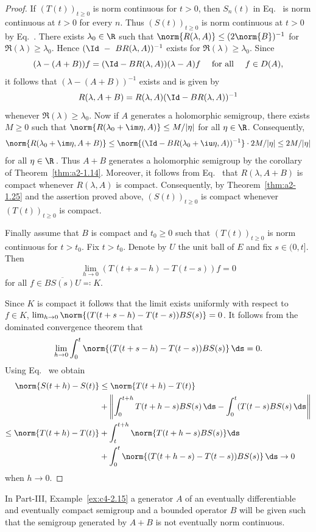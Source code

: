 \begin{proof}
If\/ $(T(t))_{t \geq 0}$ is norm continuous for $t > 0$, then $S_{n}(t)$ in Eq.~ is norm continuous at $t > 0$ for every $n$.
Thus $(S(t))_{t \geq 0}$ is norm continuous at $t > 0$ by Eq.~.
There exists $\lambda_{0} \in \R$ such that 
$\norm{R(\lambda,A)} \leq (2\norm{B})^{-1}$ for $\Re(\lambda) \geq \lambda_{0}$.
Hence $(\Id~-~BR(\lambda,A))^{-1}$ exists for $\Re(\lambda) \geq \lambda_{0}$.
Since 
\[
(\lambda -(A+B))f = (\Id - BR(\lambda,A))(\lambda - A)f  \quad \text{ for all } \quad f \in D(A),
\]
it follows that $(\lambda-(A+B))^{-1}$ exists and is given by
\begin{equation}\label{eq:a2-1.12}
    R(\lambda,A+B) = R(\lambda,A)(\Id-BR(\lambda,A))^{-1}
\end{equation}
whenever $\Re(\lambda) \geq \lambda_{0}$.
Now if\/ $A$ generates a holomorphic semigroup, there exists $M \geq 0$ such that $\norm{R(\lambda_{0}+\im\eta,A)} \leq M/|\eta|$ for all $\eta \in \R$.
Consequently, 
\[
\norm{R(\lambda_{0}+\im\eta,A+B)} \leq \norm{(\Id-BR(\lambda_{0} + \iu \eta,A))^{-1}} \cdot 2M/|\eta| \leq 2M/|\eta|
\]
for all $\eta \in \R$\,.
Thus $A + B$ generates a holomorphic semigroup by the corollary of Theorem~\ref{thm:a2-1.14}.
Moreover, it follows from Eq.~  that $R(\lambda,A+B)$ is compact whenever $R(\lambda,A)$  is compact.
Consequently, by Theorem~\ref{thm:a2-1.25} and the  assertion proved above, $(S(t))_{t \geq 0}$ is compact whenever $(T(t))_{t \geq 0}$ is compact.

Finally assume that $B$ is compact and $t_{0} \geq 0$ such that $(T(t))_{t \geq 0}$ 
is norm continuous for $t > t_{0}$.
Fix $t > t_{0}$.
Denote by $U$ the unit ball of\/ $E$ and fix $s \in (0,t]$.
Then
\[
    \lim_{h \to 0} (T(t+s-h) - T(t-s))f = 0
\]
for all $f \in \overline{BS(s)U} \eqqcolon K$.

Since $K$ is compact it follows that the limit exists uniformly with respect to $f \in K$, \ie  
$\lim_{h \to 0} \norm{(T(t+s-h) - T(t-s))BS(s)} = 0$.
It follows from the dominated convergence theorem that
\begin{equation}\label{eq:a2-1.13}
    \lim_{h \to 0} \int_{0}^{t} \norm{(T(t+s-h) - T(t-s))BS(s)}\, \ds = 0.
\end{equation}
Using  Eq.~  we obtain 
\begin{align*}
	\norm{S(t+h) - S(t)} &\leq \norm{T(t+h) - T(t)}   \\
	&+  \left\| \int_{0}^{t+h} T(t+h-s)BS(s)\, \ds 
	-  \int_{0}^{t} (T(t-s)BS(s)\, \ds \right\|  \\
	\leq \norm{T(t+h) - T(t)} &+ \int_{t}^{t+h} \norm{T(t+h-s)BS(s)} \ds    \\ 
	&+ \int_{0}^{t} \norm{(T(t+h-s) - T(t-s))BS(s)}\, \ds \to 0 
\end{align*}
when  $h \to 0$. 	
\end{proof}
In Part-III, Example~\ref{ex:c4-2.15} a generator $A$ of an eventually differentiable and eventually compact semigroup and a bounded operator $B$ will be given such that the semigroup generated by $A+B$ is not eventually norm continuous.

